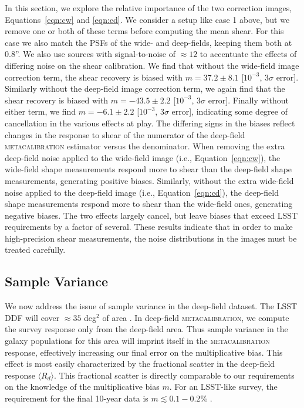 \documentclass[twocolumn]{openjournal}
\makeatletter
\newcommand{\mcal}{\textsc{metacalibration}\@\xspace}
\makeatother
\begin{document}
In this section, we explore the relative importance of the two correction images,
Equations~\ref{eqn:cw} and \ref{eqn:cd}. We consider a setup like case 1 above, but we
remove one or both of these terms before computing the mean shear. For this case we also
match the PSFs of the wide- and deep-fields, keeping them both at 0.8''. We also use
sources with signal-to-noise of $\approx12$ to accentuate the effects of differing noise
on the shear calibration. We find that without the wide-field image correction term, the
shear recovery is biased with $m=37.2\pm8.1$ [$10^{-3}$, $3\sigma$ error]. Similarly
without the deep-field image correction term, we again find that the shear recovery is biased
with $m=-43.5\pm2.2$ [$10^{-3}$, $3\sigma$ error]. Finally without either term, we find
$m=-6.1\pm2.2$ [$10^{-3}$, $3\sigma$ error], indicating some degree of cancellation in
the various effects at play. The differing signs in the biases reflect changes in the
response to shear of the numerator of the deep-field \mcal estimator versus the
denominator. When removing the extra deep-field noise applied to the wide-field image
(i.e., Equation~\ref{eqn:cw}), the wide-field shape measurements respond more to shear
than the deep-field shape measurements, generating positive biases. Similarly, without
the extra wide-field noise applied to the deep-field image (i.e.,
Equation~\ref{eqn:cd}), the deep-field shape measurements respond more to shear than the
wide-field ones, generating negative biases. The two effects largely cancel, but leave
biases that exceed LSST requirements by a factor of several. These results indicate that
in order to make high-precision shear measurements, the noise distributions in the
images must be treated carefully.



\subsection{Sample Variance}\label{sec:sv}

We now address the issue of sample variance in the deep-field dataset. The LSST DDF will
cover $\approx35$ deg$^2$ of area \citep{lsst-ddf-design,ivezic2019lsst}. In deep-field
\mcal, we compute the survey response only from the deep-field area. Thus sample
variance in the galaxy populations for this area will imprint itself in the \mcal
response, effectively increasing our final error on the multiplicative bias. This effect
is most easily characterized by the fractional scatter in the deep-field response
$\langle R_{d}\rangle$. This fractional scatter is directly comparable to our
requirements on the knowledge of the multiplicative bias $m$. For an LSST-like survey,
the requirement for the final 10-year data is $m \lesssim 0.1-0.2\%$
\citep{huterer2006,descsrd}.
\end{document}
